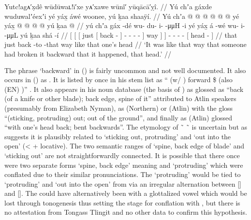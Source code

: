 \ex\label{ex:91-190-broke-back-that-head}%
%
\begingl
	\glpreamble	Yutc!agᴀ′x̣dê wūdūwaʟ!ī′xe yᴀ′xawe wūnî′ yūqācā′ỵî. //
	\glpreamble	Yú chʼa gáxde wuduwalʼéexʼi yé yáx̱ áwé woonee, yú ḵaa shaaÿí. //
	\gla	{} {} Yú {} chʼa {}  @ {} {}
			 @ {} @ {} @ {} @ {} @ {} {}
			yé {} yáx̱ {}  @ {}
		 @ {} @ {} @ {}
		{} yú ḵaa  @ {} {} //
	\glb	{} {} yú {} chʼa {} gáx -dé {}
			wu- du- i-  -μμH -i {}
			yé {} yáx̱ {} á -wé
		wu- i-  -μμL
		{} yú ḵaa shá -í {} //
	\glc	{}[ {}[ 
			{}[ just {}[ back - {}]
			- - -  -  {}]
			way {}]  {}]  -
		- -  -
		{}[   head - {}] //
	\gld	{} {} that {} just {} back -to {}
			 {} {} {} {} -that {}
			way {} like {}  {}
		 {} {} {}
		{} that one’s head {} {} //
	\glft	‘It was like that way that someone had broken it backward that it happened, that head.’
		//
\endgl
\xe

The phrase  ‘backward’ in (\lastx) is fairly uncommon and not well documented.
It also occurs in (\nextx) as .
It is listed by \citeauthor{leer:1978b} once in his stem list as “ (w/ ) forward \$  (also (EN) )” \parencite[56]{leer:1978b}.
It also appears in his noun database (the basis of \cite{leer:2001}) as  glossed as “back (of a knife or other blade); back edge, spine of it” attributed to Atlin speakers (presumably from  Elizabeth Nyman), as  (Northern) or  (Atlin) with the gloss “(sticking, protruding) out; out of the ground”, and finally as  (Atlin) glossed “with one’s head back; bent backwards”.
The etymology of  \~\  \~\  is uncertain but as \textcite{leer:1978b} suggests it is plausibly related to  ‘sticking out, protruding’ and  ‘out into the open’ (<  +  locative).
The two semantic ranges of ‘spine, back edge of blade’ and ‘sticking out’ are not straightforwardly connected.
It is possible that there once were two separate forms  ‘spine, back edge’ meaning and  ‘protruding’ which were conflated due to their similar pronunciations.
The  ‘protruding’ would be tied to  ‘protruding’ and  ‘out into the open’ from  via an irregular alternation between [] and [].
The  could have alternatively been  with a glottalized vowel which would be lost through tonogenesis thus setting the stage for conflation with , but there is no attestation from Tongass Tlingit and no other data to confirm this hypothesis.

